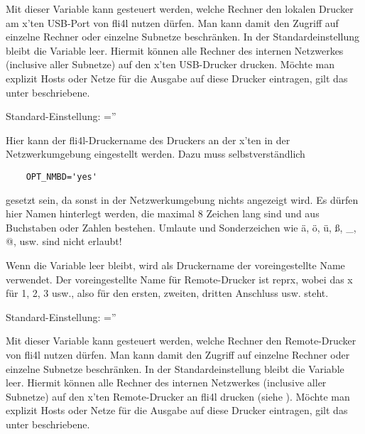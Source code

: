 \begin{description}

    Mit dieser Variable kann gesteuert werden, welche Rechner den lokalen
    Drucker am x'ten USB-Port von fli4l nutzen dürfen. Man kann damit den
    Zugriff auf einzelne Rechner oder einzelne Subnetze beschränken. In der
    Standardeinstellung bleibt die Variable leer. Hiermit können alle Rechner
    des internen Netzwerkes (inclusive aller Subnetze) auf den x'ten USB-Drucker
    drucken.
    Möchte man explizit Hosts oder Netze für die Ausgabe auf diese Drucker
    eintragen, gilt das unter  beschriebene.

    Standard-Einstellung: =''



    Hier kann der fli4l-Druckername des Druckers an der x'ten
     in der Netzwerkumgebung
    eingestellt werden. Dazu muss selbstverständlich

\begin{example}
\begin{verbatim}
    OPT_NMBD='yes'
\end{verbatim}
\end{example}

    gesetzt sein, da sonst in der Netzwerkumgebung nichts angezeigt wird.
    Es dürfen hier Namen hinterlegt werden, die maximal 8 Zeichen lang sind und
    aus Buchstaben oder Zahlen bestehen. Umlaute und Sonderzeichen wie ä, ö, ü,
    ß, \_, @, usw. sind nicht erlaubt!

    Wenn die Variable leer bleibt, wird als Druckername der voreingestellte Name
    verwendet. Der voreingestellte Name für Remote-Drucker ist reprx, wobei das
    x für 1, 2, 3 usw., also für den ersten, zweiten, dritten Anschluss usw.
    steht.

    Standard-Einstellung: =''



    Mit dieser Variable kann gesteuert werden, welche Rechner den Remote-Drucker
    von fli4l nutzen dürfen. Man kann damit den Zugriff auf einzelne Rechner
    oder einzelne Subnetze beschränken. In der Standardeinstellung bleibt die
    Variable leer. Hiermit können alle Rechner des internen Netzwerkes
    (inclusive aller Subnetze) auf den x'ten Remote-Drucker an fli4l drucken
    (siehe ).
    Möchte man explizit Hosts oder Netze für die Ausgabe auf diese Drucker
    eintragen, gilt das unter  beschriebene.


\end{description}
